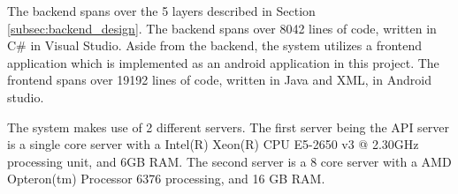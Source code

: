 The backend spans over the 5 layers described in Section \ref{subsec:backend_design}. The backend spans over 8042 lines of code, written in C# in Visual Studio. Aside from the backend, the system utilizes a frontend application which is implemented as an android application in this project. The frontend spans over 19192 lines of code, written in Java and XML, in Android studio.

The system  makes use of 2 different servers. The first server being the API server is a single core server with a Intel(R) Xeon(R) CPU E5-2650 v3 @ 2.30GHz processing unit, and 6GB RAM. The second server is a 8 core server with a AMD Opteron(tm) Processor 6376 processing, and 16 GB RAM.